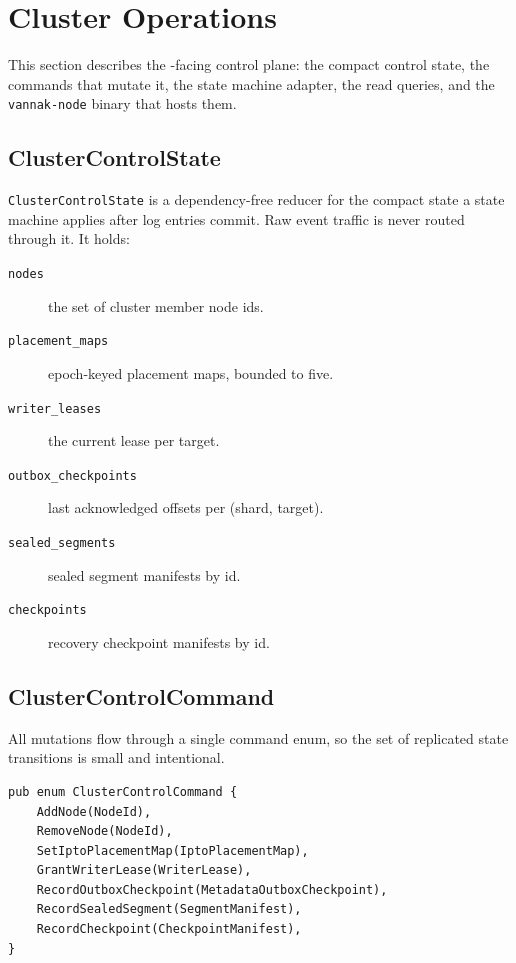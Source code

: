 \section{Cluster Operations}
\label{sec:cluster}

This section describes the \raft{}-facing control plane: the compact control
state, the commands that mutate it, the \graft{} state machine adapter, the
read queries, and the \texttt{vannak-node} binary that hosts them.

\subsection{ClusterControlState}

\texttt{ClusterControlState} is a dependency-free reducer for the compact state a
\raft{} state machine applies after log entries commit. Raw event traffic is
never routed through it. It holds:

\begin{description}
\item[\texttt{nodes}] the set of cluster member node ids.
\item[\texttt{placement\_maps}] epoch-keyed placement maps, bounded to five.
\item[\texttt{writer\_leases}] the current lease per \ipto{} target.
\item[\texttt{outbox\_checkpoints}] last acknowledged offsets per (shard, target).
\item[\texttt{sealed\_segments}] sealed segment manifests by id.
\item[\texttt{checkpoints}] recovery checkpoint manifests by id.
\end{description}

\subsection{ClusterControlCommand}

All mutations flow through a single command enum, so the set of replicated
state transitions is small and intentional.

\begin{lstlisting}
pub enum ClusterControlCommand {
    AddNode(NodeId),
    RemoveNode(NodeId),
    SetIptoPlacementMap(IptoPlacementMap),
    GrantWriterLease(WriterLease),
    RecordOutboxCheckpoint(MetadataOutboxCheckpoint),
    RecordSealedSegment(SegmentManifest),
    RecordCheckpoint(CheckpointManifest),
}
\end{lstlisting}

